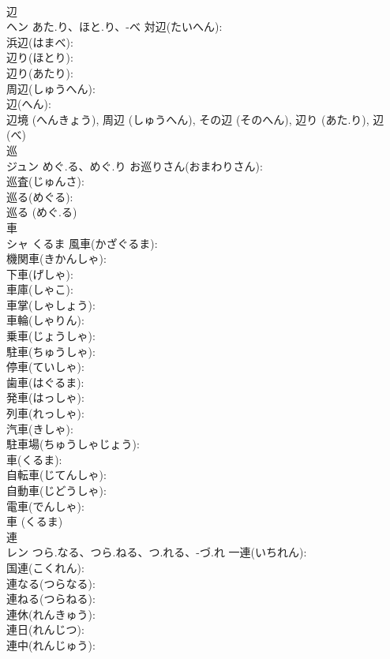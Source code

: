 \documentclass[8pt]{extreport}
\begin{document}
\begin{CJK}{UTF8}{min}
\\	辺			
\\	ヘン	あた.り、ほと.り、-べ	対辺(たいへん): 
\\	浜辺(はまべ): 
\\	辺り(ほとり): 
\\	辺り(あたり): 
\\	周辺(しゅうへん): 
\\	辺(へん): 
\\	辺境 (へんきょう), 周辺 (しゅうへん), その辺 (そのへん), 辺り (あた.り), 辺 (べ)
\\	巡			
\\	ジュン	めぐ.る、めぐ.り	お巡りさん(おまわりさん): 
\\	巡査(じゅんさ): 
\\	巡る(めぐる): 
\\	巡る (めぐ.る)
\\	車			
\\	シャ	くるま	風車(かざぐるま): 
\\	機関車(きかんしゃ): 
\\	下車(げしゃ): 
\\	車庫(しゃこ): 
\\	車掌(しゃしょう): 
\\	車輪(しゃりん): 
\\	乗車(じょうしゃ): 
\\	駐車(ちゅうしゃ): 
\\	停車(ていしゃ): 
\\	歯車(はぐるま): 
\\	発車(はっしゃ): 
\\	列車(れっしゃ): 
\\	汽車(きしゃ): 
\\	駐車場(ちゅうしゃじょう): 
\\	車(くるま): 
\\	自転車(じてんしゃ): 
\\	自動車(じどうしゃ): 
\\	電車(でんしゃ): 
\\	車 (くるま)
\\	連		
\\	レン	つら.なる、つら.ねる、つ.れる、-づ.れ	一連(いちれん): 
\\	国連(こくれん): 
\\	連なる(つらなる): 
\\	連ねる(つらねる): 
\\	連休(れんきゅう): 
\\	連日(れんじつ): 
\\	連中(れんじゅう): 

\end{CJK}
\end{document}
